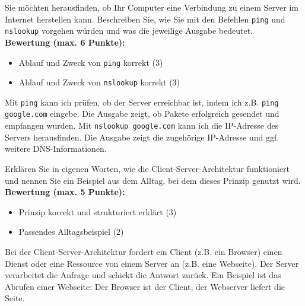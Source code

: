\begin{myexercise}

    Sie möchten herausfinden, ob Ihr Computer eine Verbindung zu einem Server im Internet herstellen kann. Beschreiben Sie, wie Sie mit den Befehlen \texttt{ping} und \texttt{nslookup} vorgehen würden und was die jeweilige Ausgabe bedeutet.
    \\[.5cm]
    \textbf{Bewertung (max. 6 Punkte):}
    \begin{itemize}
        \item Ablauf und Zweck von \texttt{ping} korrekt (3)
        \item Ablauf und Zweck von \texttt{nslookup} korrekt (3)
    \end{itemize}

    \begin{myanswer}
        Mit \texttt{ping} kann ich prüfen, ob der Server erreichbar ist, indem ich z.B. \texttt{ping google.com} eingebe. Die Ausgabe zeigt, ob Pakete erfolgreich gesendet und empfangen wurden. Mit \texttt{nslookup google.com} kann ich die IP-Adresse des Servers herausfinden. Die Ausgabe zeigt die zugehörige IP-Adresse und ggf. weitere DNS-Informationen.
    \end{myanswer}
\end{myexercise}

\begin{myexercise}

    Erklären Sie in eigenen Worten, wie die Client-Server-Architektur funktioniert und nennen Sie ein Beispiel aus dem Alltag, bei dem dieses Prinzip genutzt wird.
    \\[.5cm]
    \textbf{Bewertung (max. 5 Punkte):}
    \begin{itemize}
        \item Prinzip korrekt und strukturiert erklärt (3)
        \item Passendes Alltagsbeispiel (2)
    \end{itemize}

    \begin{myanswer}
        Bei der Client-Server-Architektur fordert ein Client (z.B. ein Browser) einen Dienst oder eine Ressource von einem Server an (z.B. eine Webseite). Der Server verarbeitet die Anfrage und schickt die Antwort zurück. Ein Beispiel ist das Abrufen einer Webseite: Der Browser ist der Client, der Webserver liefert die Seite.
    \end{myanswer}
\end{myexercise}

